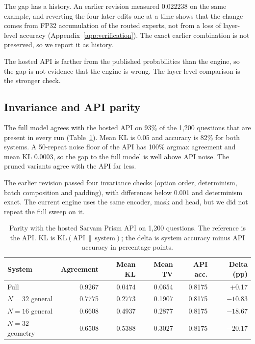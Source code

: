 \documentclass[11pt,a4paper]{article}
\begin{document}
The gap has a history. An earlier revision measured 0.022238 on the same example, and reverting the four later edits one at a time shows that the change comes from FP32 accumulation of the routed experts, not from a loss of layer-level accuracy (Appendix~\ref{app:verification}). The exact earlier combination is not preserved, so we report it as history.

The hosted API is farther from the published probabilities than the engine, so the gap is not evidence that the engine is wrong. The layer-level comparison is the stronger check.

\subsection{Invariance and API parity}

The full model agrees with the hosted API on 93\% of the 1,200 questions that are present in every run (Table~\ref{tab:api}). Mean KL is 0.05 and accuracy is 82\% for both systems. A 50-repeat noise floor of the API has 100\% argmax agreement and mean KL 0.0003, so the gap to the full model is well above API noise. The pruned variants agree with the API far less.

The earlier revision passed four invariance checks (option order, determinism, batch composition and padding), with differences below 0.001 and determinism exact. The current engine uses the same encoder, mask and head, but we did not repeat the full sweep on it.

\begin{table}[!htbp]
\centering
\small
\caption{Parity with the hosted Sarvam Prism API on 1,200 questions. The reference is the API. KL is $\mathrm{KL}(\text{API}\,\|\,\text{system})$; the delta is system accuracy minus API accuracy in percentage points.}
\label{tab:api}
\begin{tabular}{lrrrrr}
\toprule
System & Agreement & Mean KL & Mean TV & API acc. & Delta (pp) \\
\midrule
Full & 0.9267 & 0.0474 & 0.0654 & 0.8175 & +0.17 \\
$N=32$ general & 0.7775 & 0.2773 & 0.1907 & 0.8175 & $-10.83$ \\
$N=16$ general & 0.6608 & 0.4937 & 0.2877 & 0.8175 & $-18.67$ \\
$N=32$ geometry & 0.6508 & 0.5388 & 0.3027 & 0.8175 & $-20.17$ \\
\bottomrule
\end{tabular}
\end{table}
\end{document}
